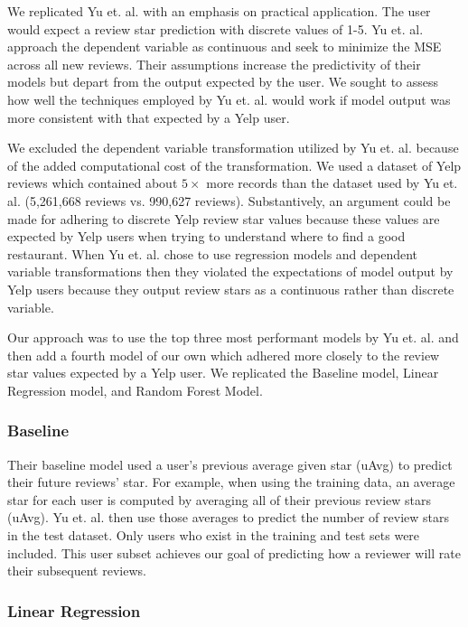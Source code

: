 \documentclass[12pt]{article}
\begin{document}
We replicated Yu et. al. \cite{yu2015restaurants} with an emphasis on practical application. The
user would expect a review star prediction with discrete values of 1-5. Yu et. al.
\cite{yu2015restaurants} approach the dependent variable as continuous and seek to minimize
the MSE across all new reviews. Their assumptions increase the predictivity of their models but
depart from the output expected by the user. We sought to assess how well the techniques employed
by Yu et. al. would work if model output was more consistent with that expected by a Yelp user.

We excluded the dependent variable transformation utilized by Yu et. al. \cite{yu2015restaurants}
because of the added computational cost of the transformation. We used a dataset of Yelp reviews
which contained about $5 \times$ more records than the dataset used by Yu et. al. \cite{yu2015restaurants} (5,261,668 reviews vs. 990,627 reviews). Substantively, an argument could be made for
adhering to discrete Yelp review star values because these values are expected by Yelp users
when trying to understand where to find a good restaurant. When Yu et. al. \cite{yu2015restaurants}
chose to use regression models and dependent variable transformations then they violated
the expectations of model output by Yelp users because they output review stars as a continuous
rather than discrete variable.

Our approach was to use the top three most performant models by Yu et. al. \cite{yu2015restaurants}
and then add a fourth model of our own which adhered more closely to the review star values
expected by a Yelp user. We replicated the Baseline model, Linear Regression model, and
Random Forest Model.

\subsubsection{Baseline}

Their baseline model used a user's previous average given star (uAvg) to predict their future
reviews' star. For example, when using the training data, an average star for each user
is computed by averaging all of their previous review stars (uAvg). Yu et. al.
\cite{yu2015restaurants} then use those averages to predict the number of review stars in the
test dataset. Only users who exist in the training and test sets were included. This user subset
achieves our goal of predicting how a reviewer will rate their subsequent reviews.

\subsubsection{Linear Regression}
\end{document}
